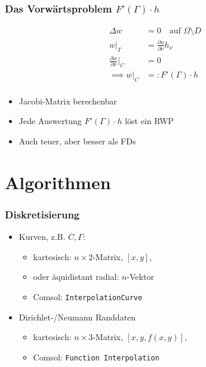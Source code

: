 \documentclass[draft]{beamer}
\begin{document}
\begin{frame}
	\frametitle{Das Vorwärtsproblem $F'(\Gamma) \cdot h$}
	\begin{minipage}{0.5\textwidth}
		\begin{align*}
			\Delta w &= 0 \quad \text{auf $\Omega \setminus D$} \\
			w|_\Gamma &= \tfrac{\partial u}{\partial \nu} h_\nu \\
			\tfrac{\partial w}{\partial \nu}|_C &= 0 \\
			\implies w|_C &=: F'(\Gamma) \cdot h \\
		\end{align*}
	\end{minipage}
	\begin{minipage}{0.48\textwidth}
		\begin{itemize}
			\item \pause
				Jacobi-Matrix berechenbar
			\item \pause
				Jede Auswertung $F'(\Gamma)\cdot h$ löst ein RWP
			\item
				Auch teuer, aber besser als FDs
		\end{itemize}
	\end{minipage}
\end{frame}

\section{Algorithmen}

\begin{frame}
	\frametitle{Diskretisierung}
	\begin{itemize}
		\item \pause
			Kurven, z.B. $C, \Gamma$:
			\begin{itemize}
				\item
					kartesisch: $n\times 2$-Matrix, $[x,y]$,
				\item
					oder äquidistant radial: $n$-Vektor
				\item
					Comsol: \texttt{InterpolationCurve}
			\end{itemize}
		\item \pause
			Dirichlet-/Neumann Randdaten
			\begin{itemize}
				\item
					kartesisch: $n\times 3$-Matrix, $[x,y,f(x,y)]$,
				\item
					Comsol: \texttt{Function Interpolation}
			\end{itemize}
	\end{itemize}
\end{frame}
\end{document}
